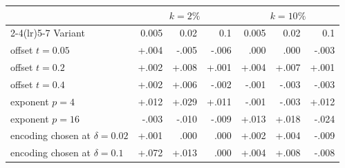 \begin{tabular}{@{}lrrrrrr@{}}
\toprule
& \multicolumn{3}{c}{$k=2\%$} & \multicolumn{3}{c}{$k=10\%$} \\
\cmidrule(lr){2-4}\cmidrule(lr){5-7}
Variant & 0.005 & 0.02 & 0.1 & 0.005 & 0.02 & 0.1 \\
\midrule
offset $t=0.05$ & +.004 & -.005 & -.006 & .000 & .000 & -.003 \\
offset $t=0.2$ & +.002 & +.008 & +.001 & +.004 & +.007 & +.001 \\
offset $t=0.4$ & +.002 & +.006 & -.002 & -.001 & -.003 & -.003 \\
exponent $p=4$ & +.012 & +.029 & +.011 & -.001 & -.003 & +.012 \\
exponent $p=16$ & -.003 & -.010 & -.009 & +.013 & +.018 & -.024 \\
encoding chosen at $\delta=0.02$ & +.001 & .000 & .000 & +.002 & +.004 & -.009 \\
encoding chosen at $\delta=0.1$ & +.072 & +.013 & .000 & +.004 & +.008 & -.008 \\
\bottomrule
\end{tabular}
